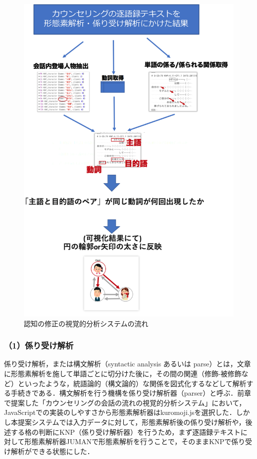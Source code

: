 \documentclass[shuuron]{kuee}
\begin{document}
\begin{figure}
  \begin{center}
    \includegraphics[clip,width=13.0cm]{charaFlow.png}
  \end{center}
  \caption{認知の修正の視覚的分析システムの流れ}
  \label{fig:charaFlow}
\end{figure}





\subsubsection{（1）係り受け解析}


係り受け解析，または構文解析（syntactic analysis あるいは parse）とは，文章に形態素解析を施して単語ごとに切分けた後に，その間の関連（修飾-被修飾など）といったような，統語論的（構文論的）な関係を図式化するなどして解析する手続きである．構文解析を行う機構を係り受け解析器（parser）と呼ぶ．前章で提案した「カウンセリングの会話の流れの視覚的分析システム」において，JavaScriptでの実装のしやすさから形態素解析器はkuromoji.jsを選択した．しかし本提案システムでは入力データに対して，形態素解析後の係り受け解析や，後述する格の判断にKNP\cite{KNP}（係り受け解析器）を行うため，まず逐語録テキストに対して形態素解析器JUMAN\cite{juman}で形態素解析を行うことで，そのままKNPで係り受け解析ができる状態にした．
\end{document}
